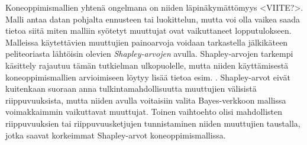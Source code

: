 Koneoppimismallien yhtenä ongelmana on niiden läpinäkymättömyys <VIITE?>. Malli antaa datan pohjalta ennusteen tai luokittelun, mutta voi olla vaikea saada tietoa siitä miten malliin syötetyt muuttujat ovat vaikuttaneet lopputulokseen. Malleissa käytettävien muuttujien painoarvoja voidaan tarkastella jälkikäteen peliteoriasta lähtöisin olevien \emph{Shapley-arvojen} avulla. Shapley-arvojen tarkempi käsittely rajautuu tämän tutkielman ulkopuolelle, mutta niiden käyttämisestä koneoppimismallien arvioimiseen löytyy lisää tietoa esim. \citet{merrick_explanation_2020}. Shapley-arvot eivät kuitenkaan suoraan anna tulkintamahdollisuutta muuttujien välisistä riippuvuuksista, mutta niiden avulla voitaisiin valita Bayes-verkkoon mallissa voimakkaimmin vaikuttavat muuttujat. Toinen vaihtoehto olisi mahdollisten riippuvuuksien tai riippuvuusketjujen tunnistaminen niiden muuttujien taustalla, jotka saavat korkeimmat Shapley-arvot koneoppimismallissa.



